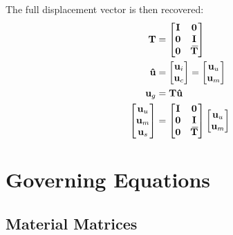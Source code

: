 \documentclass[10pt,b5paper,titlepage]{book}
\newcommand{\m}{\mathbf}
\newcommand{\closure}[2][3]{%
{}\mkern#1mu\overline{\mkern-#1mu#2}}
\newenvironment{eqarray}
{
    \begin{eqnarray}
        \begin{aligned}
}
{
        \end{aligned}
    \end{eqnarray}
}
\begin{document}
The full displacement vector is then recovered:
\begin{eqarray}
    \m{T} &= \begin{bmatrix}
        \m{I} & \m{0} \\
        \m{0} & \m{I} \\
        \m{0} & \m{\closure{T}} \\
    \end{bmatrix} \\
    \m{\hat{u}} &= \begin{bmatrix}
        \m{u}_i \\
        \m{u}_c \\
    \end{bmatrix}
    = \begin{bmatrix}
        \m{u}_u \\
        \m{u}_m \\
    \end{bmatrix} \\
    \m{u}_g &= \m{T} \m{\hat{u}} \\
    \begin{bmatrix}
        \m{u}_u \\
        \m{u}_m \\
        \m{u}_s \\
    \end{bmatrix}
    &= \begin{bmatrix}
        \m{I} & \m{0} \\
        \m{0} & \m{I} \\
        \m{0} & \m{\closure{T}} \\
    \end{bmatrix}
    \begin{bmatrix}
        \m{u}_u \\
        \m{u}_m \\
    \end{bmatrix}
\end{eqarray}





\newpage
\chapter{Governing Equations}

\section{Material Matrices}
\end{document}

